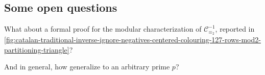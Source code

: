 \subsection{Some open questions}

What about a formal proof for the modular characterization of $\mathcal{C}_{\equiv_{2}}^{-1}$, reported in 
\autoref{fig:catalan-traditional-inverse-ignore-negatives-centered-colouring-127-rows-mod2-partitioning-triangle}?

And in general, how generalize to an arbitrary prime $p$?
